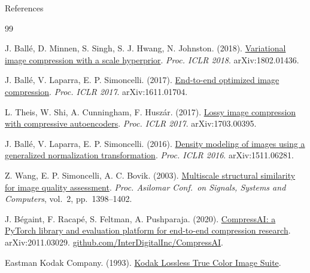 \documentclass[aspectratio=169, 12pt]{beamer}
\begin{document}
\begin{frame}[allowframebreaks]{References}
    \footnotesize
    \begin{thebibliography}{99}

        J. Ball\'e, D. Minnen, S. Singh, S. J. Hwang, N. Johnston. (2018).
        \newblock \href{https://arxiv.org/abs/1802.01436}{Variational image compression with a scale hyperprior}.
        \newblock \textit{Proc. ICLR 2018}. arXiv:1802.01436.

        J. Ball\'e, V. Laparra, E. P. Simoncelli. (2017).
        \newblock \href{https://arxiv.org/abs/1611.01704}{End-to-end optimized image compression}.
        \newblock \textit{Proc. ICLR 2017}. arXiv:1611.01704.

        L. Theis, W. Shi, A. Cunningham, F. Husz\'ar. (2017).
        \newblock \href{https://arxiv.org/abs/1703.00395}{Lossy image compression with compressive autoencoders}.
        \newblock \textit{Proc. ICLR 2017}. arXiv:1703.00395.

        J. Ball\'e, V. Laparra, E. P. Simoncelli. (2016).
        \newblock \href{https://arxiv.org/abs/1511.06281}{Density modeling of images using a generalized normalization transformation}.
        \newblock \textit{Proc. ICLR 2016}. arXiv:1511.06281.

        Z. Wang, E. P. Simoncelli, A. C. Bovik. (2003).
        \newblock \href{https://doi.org/10.1109/ACSSC.2003.1292216}{Multiscale structural similarity for image quality assessment}.
        \newblock \textit{Proc. Asilomar Conf.\ on Signals, Systems and Computers}, vol.\ 2, pp.\ 1398--1402.

        J. B\'egaint, F. Racap\'e, S. Feltman, A. Pushparaja. (2020).
        \newblock \href{https://arxiv.org/abs/2011.03029}{CompressAI: a PyTorch library and evaluation platform for end-to-end compression research}.
        \newblock arXiv:2011.03029. \href{https://github.com/InterDigitalInc/CompressAI}{github.com/InterDigitalInc/CompressAI}.

        Eastman Kodak Company. (1993).
        \newblock \href{http://r0k.us/graphics/kodak/}{Kodak Lossless True Color Image Suite}.

    \end{thebibliography}
\end{frame}
\end{document}

